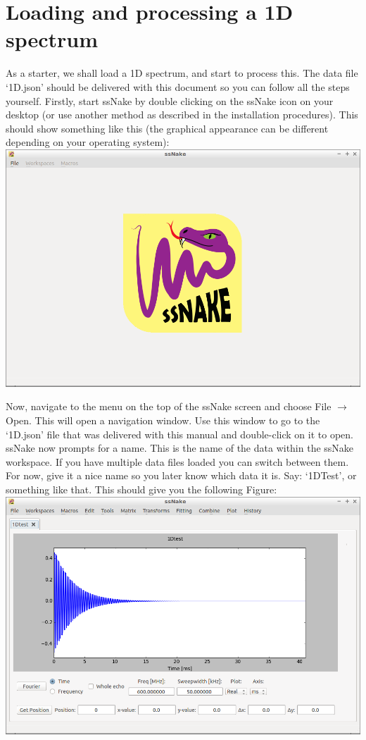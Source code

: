 \documentclass[11pt,a4paper]{article}
\begin{document}
\section{Loading and processing a 1D spectrum}
As a starter, we shall load a 1D spectrum, and start to process this. The data file `1D.json' should be delivered with this document so you can follow all the steps yourself. Firstly, start ssNake by double clicking on the ssNake icon on your desktop (or use another method as described in the installation procedures). This should show something like this (the graphical appearance can be different depending on your operating system):\\
\includegraphics[width=\linewidth]{Images/StartScreen.png}

Now, navigate to the menu on the top of the ssNake screen and choose File $\rightarrow$ Open. This will open a navigation window. Use this window to go to the `1D.json' file that was delivered with this manual and double-click on it to open. ssNake now prompts for a name. This is the name of the data within the ssNake workspace. If you have multiple data files loaded you can switch between them. For now, give it a nice name so you later know which data it is. Say: `1DTest', or something like that. This should give you the following Figure:\\
\includegraphics[width=\linewidth]{Images/1Dfid.png}
\end{document}
